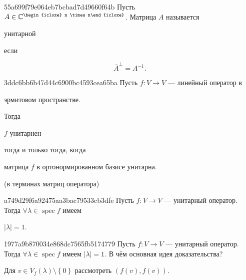 \begin{note}{55a699f79e064eb7bcbad7d49660f64b}
    Пусть \({ A \in \mathbb C^{\begin{icloze}{3}n \times n\end{icloze}} }\).
    Матрица \({ A }\) называется \begin{icloze}{2}унитарной\end{icloze} если
    \begin{icloze}{1}
        \[
            \overline{A}^{\perp} = A^{-1}.
        \]
    \end{icloze}
\end{note}

\begin{note}{3ddc6bb6b47d44c6900bc4593cea65ba}
    Пусть \({ f : V \to V }\) --- линейный оператор в \begin{icloze}{3}эрмитовом пространстве.\end{icloze}
    Тогда \begin{icloze}{2}\({ f }\) унитарнен\end{icloze} тогда и только тогда, когда
    \begin{icloze}{1}матрица \({ f }\) в ортонормированном базисе унитарна.\end{icloze}

    \begin{center}
        \tiny
        (в терминах матриц оператора)
    \end{center}
\end{note}

\begin{note}{a749d29f6a92475aa3bac79533cb3dfe}
    Пусть \({ f : V \to V }\) --- унитарный оператор.
    Тогда \({ \forall \lambda \in \operatorname{spec} f }\) имеем \begin{icloze}{1}\({ \lvert \lambda \rvert = 1 }\).\end{icloze}
\end{note}

\begin{note}{1977a9b870034e868dc7565fb5174779}
    Пусть \({ f : V \to V }\) --- унитарный оператор.
    Тогда \({ \forall \lambda \in \operatorname{spec} f }\) имеем \({ \lvert \lambda \rvert = 1 }\).
    В чём основная идея доказательства?

    \begin{cloze}{1}
        Для \({ v \in V_f(\lambda) \setminus \left\{ 0 \right\} }\) рассмотреть \({ (f(v), f(v)) }\).
    \end{cloze}
\end{note}

